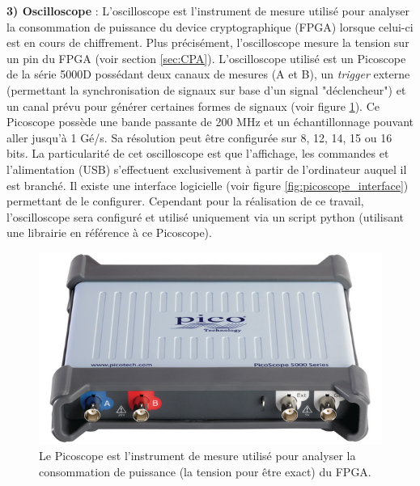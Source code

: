 \documentclass[oneside]{book}
\begin{document}
\hspace{-0.5cm}\textbf{3) Oscilloscope} : L'oscilloscope est l'instrument de mesure utilisé pour analyser la consommation de puissance du device cryptographique (FPGA) lorsque celui-ci est en cours de chiffrement. Plus précisément, l'oscilloscope mesure la tension sur un pin du FPGA (voir section \ref{sec:CPA}). L'oscilloscope utilisé est un Picoscope \cite{pico_datasheet}\cite{bronks_picoscope_nodate} de la série 5000D possédant deux canaux de mesures (A et B), un \textit{trigger} externe (permettant la synchronisation de signaux sur base d'un signal "déclencheur") et un canal prévu pour générer certaines formes de signaux (voir figure \ref{fig:picoscope}). Ce Picoscope possède une bande passante de 200 MHz et un échantillonnage pouvant aller jusqu'à 1 Gé/s. Sa résolution peut être configurée sur 8, 12, 14, 15 ou 16 bits. La particularité de cet oscilloscope est que l'affichage, les commandes et l'alimentation (USB) s'effectuent exclusivement à partir de l'ordinateur auquel il est branché. Il existe une interface logicielle (voir figure \ref{fig:picoscope_interface}) permettant de le configurer. Cependant pour la réalisation de ce travail, l'oscilloscope sera configuré et utilisé uniquement via un script python (utilisant une librairie en référence à ce Picoscope).

\begin{figure}[htbp]
    \centering
    \includegraphics[scale=0.38]{image/picoscope}
    \caption{Le Picoscope est l'instrument de mesure utilisé pour analyser la consommation de puissance (la tension pour être exact) du FPGA.}
    \label{fig:picoscope} 
\end{figure}
\end{document}
